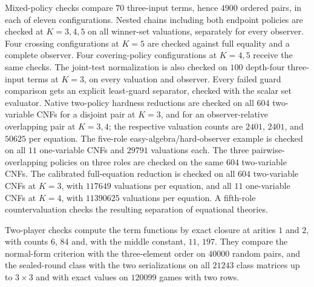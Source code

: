 Mixed-policy checks compare $70$ three-input terms, hence $4900$ ordered
pairs, in each of eleven configurations. Nested chains including both
endpoint policies are checked at $K=3,4,5$ on all winner-set valuations,
separately for every observer. Four crossing configurations at $K=5$
are checked against full equality and a complete observer. Four
covering-policy configurations at $K=4,5$ receive the same checks.
The joint-test normalization is also checked on $100$ depth-four
three-input terms at $K=3$, on every valuation and observer. Every failed
guard comparison gets an explicit least-guard separator, checked with
the scalar set evaluator. Native two-policy hardness reductions are
checked on all $604$ two-variable CNFs for a disjoint pair at $K=3$,
and for an observer-relative overlapping pair at $K=3,4$; the respective
valuation counts are $2401$, $2401$, and $50625$ per equation. The
five-role easy-algebra/hard-observer example is checked on all $11$
one-variable CNFs and $29791$ valuations each. The three pairwise-overlapping
policies on three roles are checked on the same $604$ two-variable CNFs.
The calibrated full-equation reduction is checked on all $604$
two-variable CNFs at $K=3$, with $117649$ valuations per equation,
and all $11$ one-variable CNFs at $K=4$, with $11390625$ valuations
per equation. A fifth-role countervaluation checks the resulting
separation of equational theories.

Two-player checks compute the term functions by exact closure at arities
$1$ and $2$, with counts $6$, $84$ and, with the middle constant, $11$, $197$.
They compare the normal-form criterion with the three-element order on
$40000$ random pairs, and the sealed-round class with the two serializations on
all $21243$ class matrices up to $3\times3$ and with exact values on $120099$
games with two rows.

